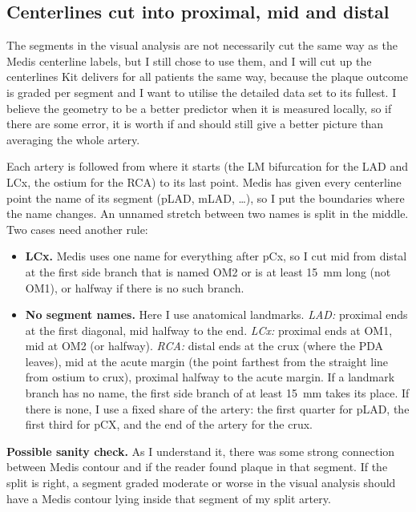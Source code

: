 \documentclass[11pt,a4paper]{article}
\begin{document}
\subsection{Centerlines cut into proximal, mid and distal}
The segments in the visual analysis are not necessarily cut the same way as the Medis centerline
labels, but I still chose to use them, and I will cut up the centerlines Kit delivers for all
patients the same way, because the plaque outcome is graded per segment and I want to utilise the detailed data set to its fullest. I believe the geometry to be a better predictor when it is measured locally, so if there are some error, it is worth if and should still give a better picture than averaging the whole artery. 

Each artery is followed from where it starts (the LM bifurcation for the LAD and LCx, the
ostium for the RCA) to its last point. Medis has given every centerline point the name of its
segment (pLAD, mLAD, \ldots), so I put the boundaries where the name changes. An unnamed stretch
between two names is split in the middle. Two cases need another rule:
\begin{itemize}
  \item \textbf{LCx.} Medis uses one name for everything after pCx, so I cut mid from distal at
        the first side branch that is named OM2 or is at least 15~mm long (not OM1), or halfway
        if there is no such branch.
  \item \textbf{No segment names.} Here I use anatomical landmarks.
        \emph{LAD:} proximal ends at the first diagonal, mid halfway to the end.
        \emph{LCx:} proximal ends at OM1, mid at OM2 (or halfway).
        \emph{RCA:} distal ends at the crux (where the PDA leaves), mid at the acute margin (the
        point farthest from the straight line from ostium to crux), proximal halfway to the
        acute margin.
        If a landmark branch has no name, the first side branch of at least 15~mm takes its
        place. If there is none, I use a fixed share of the artery: the first quarter for pLAD,
        the first third for pCX, and the end of the artery for the crux.
\end{itemize}

\textbf{Possible sanity check.} As I understand it, there was some strong connection between Medis contour and if the reader found plaque in that segment.  If the split is right, a segment graded moderate or worse in the visual analysis should
have a Medis contour lying inside that segment of my split artery. 
\end{document}
